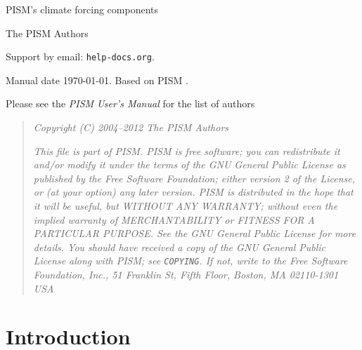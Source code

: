 \documentclass[titlepage,letterpaper,final]{scrartcl}
\begin{document}
\begin{titlepage}

  \begin{center}
    \vspace*{3.5cm}
    {\huge{} PISM's climate forcing components}
    \vspace{0.5cm}

    {\Large The PISM Authors}
    \vspace{1cm}

    \vfill

    \small Support by email: \texttt{help\@@pism-docs.org}.
    \medskip

    Manual date \today. Based on PISM \PISMREV.
    \medskip

    \PISMDOWNLOADMSG
  \end{center}
\end{titlepage}

\newpage
\phantom{bob}

\begin{center}
  Please see the \emph{PISM User's Manual} for the list of authors
\end{center}

\vspace{0.2in}
\begin{quote}
  \textsl{Copyright (C) 2004--2012 The PISM Authors}
  \medskip

  \noindent \textsl{This file is part of PISM.  PISM is free software; you can redistribute it and/or modify it under the terms of the GNU General Public License as published by the Free Software Foundation; either version 2 of the License, or (at your option) any later version.  PISM is distributed in the hope that it will be useful, but WITHOUT ANY WARRANTY; without even the implied warranty of MERCHANTABILITY or FITNESS FOR A PARTICULAR PURPOSE.  See the GNU General Public License for more details.  You should have received a copy of the GNU General Public License along with PISM; see \emph{\texttt{COPYING}}.  If not, write to the Free Software Foundation, Inc., 51 Franklin St, Fifth Floor, Boston, MA  02110-1301 USA}
\end{quote}

\newpage
\setcounter{tocdepth}{3}
\small
\tableofcontents
\normalsize

\newpage


\section{Introduction}
\label{sect:intro}
\end{document}
